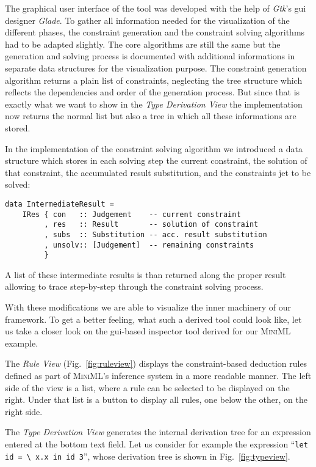 The graphical user interface of the tool was developed with the help
of \textit{Gtk}'s gui designer \textit{Glade}. To gather all
information needed for the visualization of the different phases, the
constraint generation and the constraint solving algorithms had to be
adapted slightly. The core algorithms are still the same but the
generation and solving process is documented with additional
informations in separate data structures for the visualization
purpose. The constraint generation algorithm returns a plain list of
constraints, neglecting the tree structure which reflects the
dependencies and order of the generation process. But since that is
exactly what we want to show in the \textit{Type Derivation View} the
implementation now returns the normal list but also a tree in which
all these informations are stored.

In the implementation of the constraint solving algorithm we
introduced a data structure which stores in each solving step the
current constraint, the solution of that constraint, the accumulated
result substitution, and the constraints jet to be solved:

\begin{lstlisting}
data IntermediateResult =
    IRes { con   :: Judgement    -- current constraint
         , res   :: Result       -- solution of constraint
         , subs  :: Substitution -- acc. result substitution
         , unsolv:: [Judgement]  -- remaining constraints
         }
\end{lstlisting}

A list of these intermediate results is than returned along the proper
result allowing to trace step-by-step through the constraint solving
process.

With these modifications we are able to visualize the inner machinery
of our framework. To get a better feeling, what such a derived tool
could look like, let us take a closer look on the gui-based inspector
tool derived for our \textsc{MiniML} example.

The \textit{Rule View} (Fig.~\ref{fig:ruleview}) displays the
constraint-based deduction rules defined as part of \textsc{MiniML}'s
inference system in a more readable manner. The left side of the view
is a list, where a rule can be selected to be displayed on the
right. Under that list is a button to display all rules, one below the
other, on the right side.



The \textit{Type Derivation View} generates the internal derivation
tree for an expression entered at the bottom text field. Let us
consider for example the expression ``\texttt{let id = \textbackslash
  x.x in id 3}'', whose derivation tree is shown in
Fig.~\ref{fig:typeview}.

